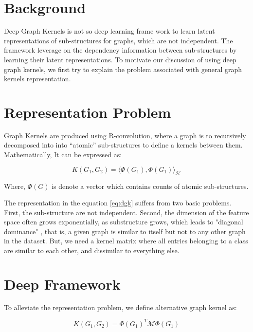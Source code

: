 \section{Background}

Deep Graph Kernels \citep{Yanardag2015} is not so deep learning frame work to learn latent representations of sub-structures for graphs, which are not independent. The framework leverage on the dependency information between sub-structures by learning their latent representations. To motivate our discussion of using deep graph kernels, we first try to explain the problem associated with general graph kernels representation.

\section{Representation Problem}

Graph Kernels are produced using R-convolution, where a graph is to recursively decomposed into into “atomic” sub-structures to define a kernels between them.  Mathematically, It can be expressed as:

%
\begin{equation}
K(G_{1}, G_{2}) = {\Bigg \langle \Phi(G_{1}), \Phi(G_{1}) \Bigg \rangle}_{\mathcal{H}}
\label{eq:dgk}
\end{equation}
%

Where, $\Phi(G)$ is denote a vector which contains counts of atomic sub-structures. 

The representation in the equation \ref{eq:dgk} suffers from two basic problems. First, the sub-structure are not independent. Second, the dimension of the feature space often grows exponentially, as substructure grows, which leads to "diagonal dominance" \citep{Kandola2003}, that is, a given graph is similar to itself but not to any other graph in the dataset. But, we need a kernel matrix where all entries belonging to a class are similar to each other, and dissimilar to everything else. 

\section{Deep Framework}

To alleviate the representation problem, we define alternative graph kernel as:

%
\begin{equation}\label{eq:pdgk}
K(G_{1}, G_{2}) = \Phi(G_{1})^{T} \mathcal{M} \Phi(G_{1})
\end{equation}
%
 
